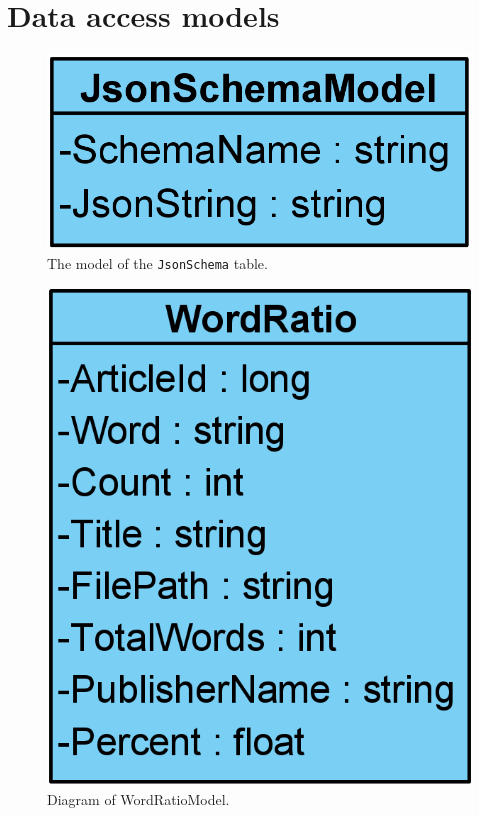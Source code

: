 \chapter{Data access models}\label{AppDataAccess}
\begin{figure}[H]
    \centering
    \includegraphics[scale=0.25]{Images/JsonSchemaModel.png}
    \caption{The model of the \texttt{JsonSchema} table.}
    \label{JsonSchemaModel}
\end{figure}
\begin{figure}[H]
    \centering
    \includegraphics[scale=0.25]{Images/WordRatioModel.png}
    \caption{Diagram of WordRatioModel.}
    \label{WordRatioModel}
\end{figure}



